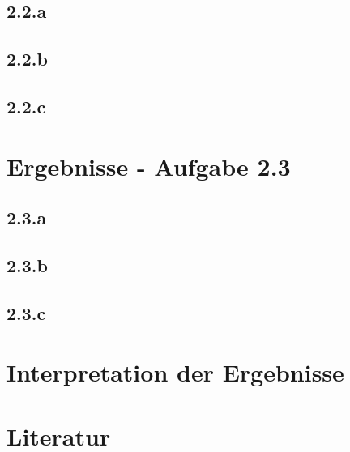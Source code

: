 \documentclass[a4paper,12pt]{article}
\begin{document}
	\subsection{2.2.a}
	
	\subsection{2.2.b}
	
	\subsection{2.2.c}
	
	\section{Ergebnisse - Aufgabe 2.3}
	\subsection{2.3.a}
	
	\subsection{2.3.b}
	
	\subsection{2.3.c}	
	
	\section{Interpretation der Ergebnisse}
	
	\section{Literatur}
\end{document}
